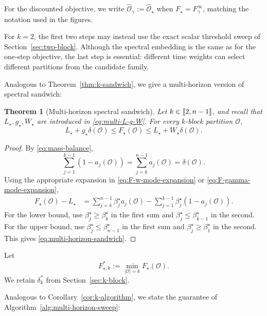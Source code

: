 \documentclass[11pt]{article}
\newtheorem{theorem}{Theorem}[section]
\newcommand{\1}{\mathbf{1}}
\providecommand{\llbracket}{\mathopen{[\mkern-2.7mu[}}
\providecommand{\rrbracket}{\mathclose{]\mkern-2.7mu]}}
\begin{document}
For the discounted objective, we write
$\widehat{\mathcal O}_\gamma:=\widehat{\mathcal O}_\star$ when
$F_\star=F_\gamma^\infty$, matching the notation used in the
figures.

For $k=2$, the first two steps may instead use the exact scalar
threshold sweep of Section~\ref{sec:two-block}.  Although the
spectral embedding is the same as for the one-step objective, the
last step is essential: different time weights can select different
partitions from the candidate family.

Analogous to Theorem~\ref{thm:k-sandwich}, we give a multi-horizon version of spectral sandwich:

\begin{theorem}[Multi-horizon spectral sandwich]
\label{thm:multi-horizon-sandwich}
Let $k\in\llbracket 2,n-1\rrbracket$, and recall that $L_\star, g_\star, W_\star$ are introduced in \eqref{eq:multi-L-g-W}. For every $k$-block partition $\mathcal O$,
\begin{equation}
    L_\star+g_\star\delta(\mathcal O)
    \leq F_\star(\mathcal O)
    \leq L_\star+W_\star\delta(\mathcal O).
    \label{eq:multi-horizon-sandwich}
\end{equation}
\end{theorem}

\begin{proof}
By \eqref{eq:mass-balance},
\[
    \sum_{j=1}^{k-1}(1-a_j(\mathcal O))
    =\sum_{j=k}^{n-1}a_j(\mathcal O)
    =\delta(\mathcal O).
\]
Using the appropriate expansion in
\eqref{eq:F-w-mode-expansion} or
\eqref{eq:F-gamma-mode-expansion},
\[
\begin{split}
    F_\star(\mathcal O)-L_\star
    &={}
      \sum_{j=k}^{n-1}\beta_j^\star a_j(\mathcal O)
      -\sum_{j=1}^{k-1}
       \beta_j^\star(1-a_j(\mathcal O)).
\end{split}
\]
For the lower bound, use
$\beta_j^\star\geq\beta_{k}^\star$ in the first
sum and $\beta_j^\star\leq\beta_{k-1}^\star$ in the second.
For the upper bound, use
$\beta_j^\star\leq\beta_{n-1}^\star$ in the first sum and
$\beta_j^\star\geq\beta_1^\star$ in the second.  This gives
\eqref{eq:multi-horizon-sandwich}.
\end{proof}

Let
\[
    F_{\star,k}^*
    :=\min_{|\mathcal O|=k}F_\star(\mathcal O).
\]
We retain $\delta_k^*$ from Section~\ref{sec:k-block}.

Analogous to Corollary~\ref{cor:k-algorithm}, we state the guarantee of Algorithm~\ref{alg:multi-horizon-sweep}:
\end{document}
